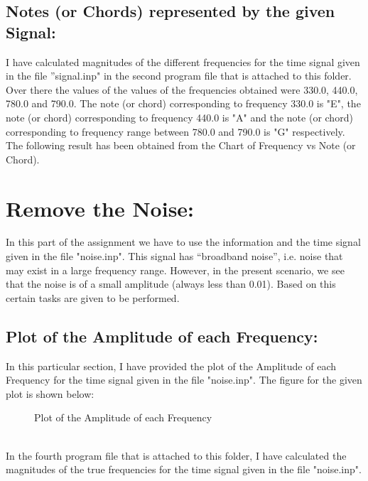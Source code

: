 \documentclass[12pt,a4paper]{article}
\begin{document}
\subsection{Notes (or Chords) represented by the given Signal:}
I have calculated magnitudes of the different frequencies for the time signal given in the file ”signal.inp" in the second program file that is attached to this folder. Over there the values of the values of the frequencies obtained were 330.0, 440.0, 780.0 and 790.0. The note (or chord) corresponding to frequency 330.0 is "E", the note (or chord) corresponding to frequency 440.0 is "A" and the note (or chord) corresponding to frequency range between 780.0 and 790.0 is "G" respectively. The following result has been obtained from the Chart of Frequency vs Note (or Chord).
\clearpage
\section{Remove the Noise:}
In this part of the assignment we have to use the information and the time signal given in the file "noise.inp". This signal has “broadband noise”, i.e. noise that may exist in a large frequency range. However, in the present scenario, we see that the noise is of a small amplitude (always less than
0.01). Based on this certain tasks are given to be performed.
\subsection{Plot of the Amplitude of each Frequency:}
In this particular section, I have provided the plot of the Amplitude of each Frequency for the time signal given in the file "noise.inp". The figure for the given plot is shown below:\\
\begin{figure}[!ht]
	\begin{center}
	\end{center}
	\caption{Plot of the Amplitude of each Frequency}
\end{figure}
\noindent
\\In the fourth program file that is attached to this folder, I have calculated the magnitudes of the true frequencies for the time signal given in the file "noise.inp".
\end{document}

